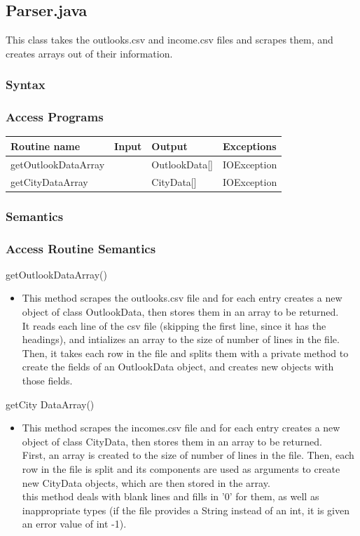 \documentclass[12pt,fleqn]{article}
\begin{document}
\subsection*{Parser.java}\label{parser}
This class takes the outlooks.csv and income.csv files and scrapes them, and creates arrays out of their information.
\subsubsection* {Syntax}

\subsubsection* {Access Programs}
\begin{tabular}{| l | l | l | l |}
\hline
\textbf{Routine name} & \textbf{Input} & \textbf{Output} & \textbf{Exceptions}\\
\hline
getOutlookDataArray & ~ & OutlookData[] & IOException\\
\hline
getCityDataArray & ~ & CityData[] & IOException\\
\hline
\end{tabular}

\subsubsection*{Semantics}
\subsubsection*{Access Routine Semantics}
\noindent getOutlookDataArray()
\begin{itemize}
\item This method scrapes the outlooks.csv file and for each entry creates a new object of class OutlookData, then stores them in an array to be returned.
\\It reads each line of the csv file (skipping the first line, since it has the headings), and intializes an array to the size of number of lines in the file. Then, it takes each row in the file and splits them with a private method to create the fields of an OutlookData object, and creates new objects with those fields.
\end{itemize}
\noindent getCity DataArray()
\begin{itemize}
\item This method scrapes the incomes.csv file and for each entry creates a new object of class CityData, then stores them in an array to be returned.
\\First, an array is created to the size of number of lines in the file. Then, each row in the file is split and its components are used as arguments to create new CityData objects, which are then stored in the array.
\\this method deals with blank lines and fills in '0' for them, as well as inappropriate types (if the file provides a String instead of an int, it is given an error value of int -1).
\end{itemize}
\end{document}

